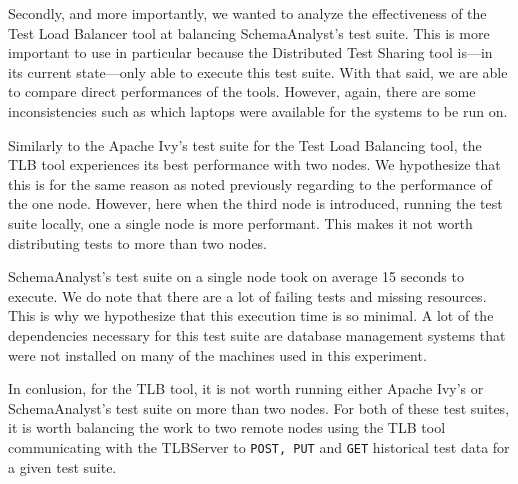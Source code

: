\documentclass{article}
\begin{document}
{Secondly, and more importantly, we wanted to analyze the effectiveness of the Test Load Balancer tool
at balancing SchemaAnalyst's test suite. This is more important to use in particular because
the Distributed Test Sharing tool is---in its current state---only able to execute this test suite.
With that said, we are able to compare direct performances of the tools. However, again, there are
some inconsistencies such as which laptops were available for the systems to be run on.

Similarly to the Apache Ivy's test suite for the Test Load Balancing tool, the TLB tool experiences
its best performance with two nodes. We hypothesize that this is for the same reason as noted previously
regarding to the performance of the one node. However, here when the third node is introduced, running the
test suite locally, one a single node is more performant. This makes it not worth distributing tests to
more than two nodes.

SchemaAnalyst's test suite on a single node took on average 15 seconds to execute. We do note that there
are a lot of failing tests and missing resources. This is why we hypothesize that this execution time
is so minimal. A lot of the dependencies necessary for this test suite are database management systems
that were not installed on many of the machines used in this experiment.

In conlusion, for the TLB tool, it is not worth running either Apache Ivy's or SchemaAnalyst's test suite
on more than two nodes. For both of these test suites, it is worth balancing the work to two
remote nodes using the TLB tool communicating with the TLBServer to \texttt{POST, PUT} and \texttt{GET} historical
test data for a given test suite.

}
\end{document}
